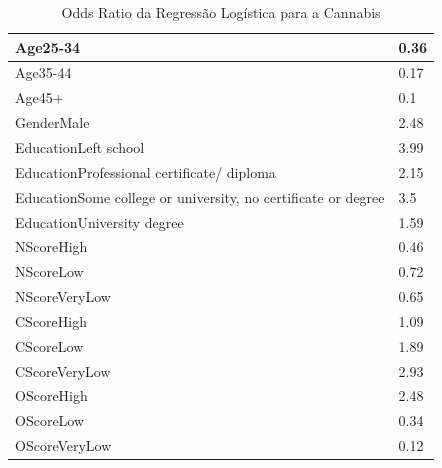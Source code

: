 \documentclass[
	article,			%
	11pt,				%
	oneside,			%
	a4paper,			%
	english,			%
	brazil,				%
	sumario=tradicional
	]{abntex2}
\begin{document}
\begin{table}[H]											
\centering											
\begin{tabular}{|l|l|}											
\hline
Age25-34	&	0.36	\\	\hline
Age35-44	&	0.17	\\	\hline
Age45+	&	0.1	\\	\hline
GenderMale	&	2.48	\\	\hline
EducationLeft	school	&	3.99	\\	\hline
EducationProfessional	certificate/	diploma	&	2.15	\\	\hline
EducationSome	college	or	university,	no	certificate	or	degree	&	3.5	\\	\hline
EducationUniversity	degree	&	1.59	\\	\hline
NScoreHigh	&	0.46	\\	\hline
NScoreLow	&	0.72	\\	\hline
NScoreVeryLow	&	0.65	\\	\hline
CScoreHigh	&	1.09	\\	\hline
CScoreLow	&	1.89	\\	\hline
CScoreVeryLow	&	2.93	\\	\hline
OScoreHigh	&	2.48	\\	\hline
OScoreLow	&	0.34	\\	\hline
OScoreVeryLow	&	0.12	\\	\hline
\end{tabular}											
\caption{Odds Ratio da	Regressão	Logística	para	a	Cannabis}					
\label{oddsratio_reglog_cannabis}											
\end{table}											
\end{document}
